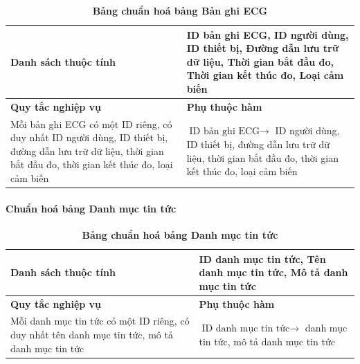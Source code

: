 \begin{table}[H]
  \caption{\bfseries \fontsize{12pt}{0pt}\selectfont Bảng chuẩn hoá bảng Bản ghi ECG}
  \centering
  \begin{tabularx}{0.9\textwidth}{|X|X|}
    \hline
    \textbf{Danh sách thuộc tính} & ID bản ghi ECG, ID người dùng, ID thiết bị, Đường dẫn lưu trữ dữ
    liệu, Thời gian bắt đầu đo, Thời gian kết thúc đo, Loại cảm biến \\
    \hline
    \textbf{Quy tắc nghiệp vụ} & \textbf{Phụ thuộc hàm} \\
    \hline
    Mỗi bản ghi ECG có một ID riêng, có duy nhất ID người dùng, ID thiết bị, đường dẫn lưu trữ dữ
    liệu, thời gian bắt đầu đo, thời gian kết thúc đo, loại cảm biến & \parbox[t]{\linewidth}{$ \text{ID bản ghi ECG} \rightarrow$ ID người dùng, ID thiết bị, đường dẫn lưu trữ dữ
    liệu, thời gian bắt đầu đo, thời gian kết thúc đo, loại cảm biến} \\
    \hline
     \\
     \\
    \hline
  \end{tabularx}
\end{table}


\paragraph{Chuẩn hoá bảng Danh mục tin tức}
\mbox{}


\begin{table}[H]
  \caption{\bfseries \fontsize{12pt}{0pt}\selectfont Bảng chuẩn hoá bảng Danh mục tin tức}
  \centering
  \begin{tabularx}{0.9\textwidth}{|X|X|}
    \hline
    \textbf{Danh sách thuộc tính} & ID danh mục tin tức, Tên danh mục tin tức, Mô tả danh mục tin
    tức \\ %
    \hline
    \textbf{Quy tắc nghiệp vụ} & \textbf{Phụ thuộc hàm} \\
    \hline
    Mỗi danh mục tin tức có một ID riêng, có duy nhất tên danh mục tin tức, mô tả danh mục tin
    tức & \parbox[t]{\linewidth}{$\text{ID danh mục tin tức} \rightarrow$ danh mục tin tức, mô tả danh mục tin
    tức} \\
    \hline
     \\
     \\
    \hline
  \end{tabularx}
\end{table}


